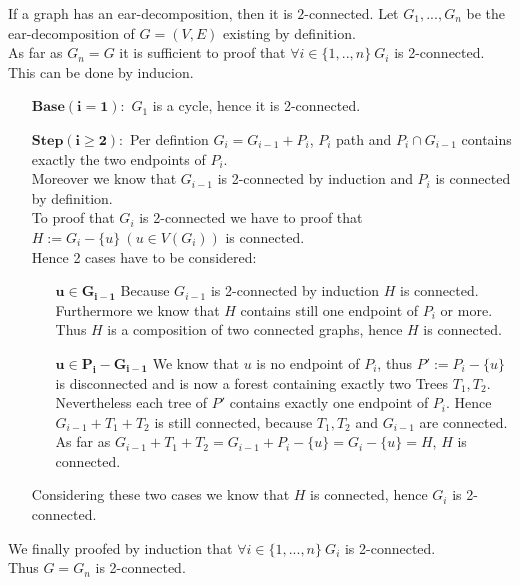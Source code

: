 \documentclass[a4paper]{article}
\begin{document}
	\begin{solution}{13}
		\begin{theorem}{If a graph has an ear-decomposition, then it is $2$-connected.}
				Let $G_1,...,G_n$ be the ear-decomposition of $G=(V,E)$ existing by definition.\\
				As far as $G_n=G$ it is sufficient to proof that $\forall i \in \{1,..,n\} ~ G_i$ is 2-connected.\\
				This can be done by inducion.\\
				\begin{itemize}
					\item[$\mathbf{Base(i=1):} $]
						$G_1$ is a cycle, hence it is 2-connected.
						
					\item[$\mathbf{Step(i \geq 2):}$]
						Per defintion $G_i=G_{i-1} + P_i$, $P_i$ path and $P_i \cap G_{i-1}$ contains exactly the two endpoints of $P_i$.\\
						Moreover we know that $G_{i-1}$ is 2-connected by induction and $P_i$ is connected by definition.\\
						To proof that $G_i$ is 2-connected we have to proof that $H:=G_i-\{u\} ~ (u \in V(G_i))$ is connected.\\
						Hence 2 cases have to be considered:\\
						\begin{itemize}
							\item[$\mathbf{u \in G_{i-1}} $]
								Because $G_{i-1}$ is 2-connected by induction $H$ is connected.\\
								Furthermore we know that $H$ contains still one endpoint of $P_i$ or more.\\
								Thus $H$ is a composition of two connected graphs, hence $H$ is connected.
						
							\item[$\mathbf{u \in P_i - G_{i-1} } $]
								We know that $u$ is no endpoint of $P_i$, thus $P':=P_i-\{u\}$ is disconnected and is now a forest containing exactly two Trees $T_1, T_2$.\\
								Nevertheless each tree of $P'$ contains exactly one endpoint of $P_i$.
								Hence $G_{i-1} + T_1 + T_2$ is still connected, because $T_1, T_2$ and $G_{i-1}$ are connected.
								As far as $G_{i-1} + T_1 + T_2 = G_{i-1} + P_i - \{u\} = G_i - \{u\} = H$, $H$ is connected.
						\end{itemize}
						
						Considering these two cases we know that $H$ is connected, hence $G_i$ is 2-connected.			
				\end{itemize}
				We finally proofed by induction that $\forall i \in \{1,...,n\} ~ G_i$ is 2-connected.\\
				Thus $G=G_n$ is 2-connected.\\
		\end{theorem}
	\end{solution}
\end{document}
